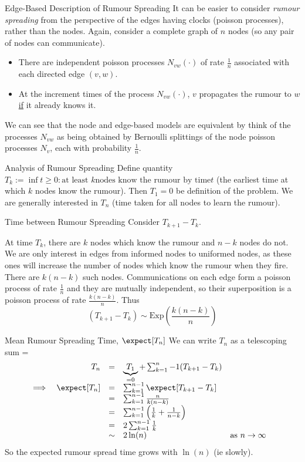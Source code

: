 \documentclass[11pt,a4paper]{article}
\begin{document}
\begin{proposition}{Edge-Based Description of Rumour Spreading}
  It can be easier to consider \textit{rumour spreading} from the perspective of the edges having clocks (poisson processes), rather than the nodes. Again, consider a complete graph of $n$ nodes (so any pair of nodes can communicate).
  \begin{itemize}
    \item There are independent poisson processes $N_{vw}(\cdot)$ of rate $\frac1n$ associated with each directed edge $(v,w)$.
    \item At the increment times of the process $N_{vw}(\cdot)$, $v$ propagates the rumour to $w$ \underline{if} it already knows it.
  \end{itemize}
  We can see that the node and edge-based models are equivalent by think of the processes $N_{vw}$ as being obtained by Bernoulli splittings of the node poisson processes $N_v$, each with probability $\frac1n$.
\end{proposition}

\begin{proposition}{Analysis of Rumour Spreading}
  Define quantity $T_k:=\inf{t\geq0:\text{at least }k\text{nodes know the rumour by time}t}$ (the earliest time at which $k$ nodes know the rumour). Then $T_1=0$ be definition of the problem. We are generally interested in $T_n$ (time taken for all nodes to learn the rumour).
\end{proposition}

\begin{proposition}{Time between Rumour Spreading}
  Consider $T_{k+1}-T_k$.
  \par At time $T_k$, there are $k$ nodes which know the rumour and $n-k$ nodes do not. We are only interest in edges from informed nodes to uniformed nodes, as these ones will increase the number of nodes which know the rumour when they fire. There are $k(n-k)$ such nodes. Communications on each edge form a poisson process of rate $\frac1n$ and they are mutually independent, so their superposition is a poisson process of rate $\frac{k(n-k)}n$. Thus
  \[ (T_{k+1}-T_k)\sim\text{Exp}\left(\frac{k(n-k)}n\right) \]
\end{proposition}

\begin{proposition}{Mean Rumour Spreading Time, $\expect[T_n]$}
  We can write $T_n$ as a telescoping sum
  \everymath={\displaystyle}
  \[\begin{array}{rrclcl}
    &T_n&=&\underbrace{T_1}_{=0}+\sum_{k=1}^n-1(T_{k+1}-T_k)&\quad&\\
    \implies&\expect[T_n]&=&\sum_{k=1}^{n-1}\expect[T_{k+1}-T_k]\\
    &&=&\sum_{k=1}^{n-1}\frac{n}{k(n-k)}\\
    &&=&\sum_{k=1}^{n-1}\left(\frac1k+\frac1{n-k}\right)\\
    &&=&2\sum_{k=1}^{n-1}\frac1k\\
    &&\sim&2\ln(n)&\text{as }n\to\infty
  \end{array}\]
  So the expected rumour spread time grows with $\ln(n)$ (ie slowly).
\end{proposition}
\end{document}
